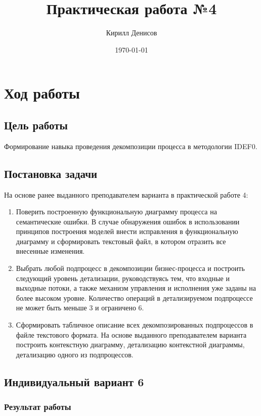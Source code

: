 \documentclass[a4paper,14pt]{extarticle}
\author{Кирилл Денисов}
\title{Практическая работа №4}
\date{\today}
\newcommand{\pathToCommonFolder}{/home/denilai/Documents/repos/latex/Common}
\begin{document}
	\thispagestyle{empty}
	
	\newpage
	\newpage
\section{Ход работы}

\subsection*{Цель работы}
Формирование навыка проведения декомпозиции
процесса в методологии IDEF0.

\subsection*{Постановка задачи}

На основе ранее выданного преподавателем
варианта в практической работе 4:
\begin{enumerate}
	\item Поверить построенную функциональную диаграмму процесса на
	семантические
	ошибки.
	В
	случае
	обнаружения
	ошибок
	в
	использовании принципов построения моделей внести исправления
	в функциональную диаграмму и сформировать текстовый файл, в
	котором отразить все внесенные изменения.
	\item Выбрать любой подпроцесс в декомпозиции бизнес-процесса и
	построить следующий уровень детализации, руководствуясь тем, что
	входные и выходные потоки, а также механизм управления и
	исполнения уже заданы на более высоком уровне. Количество
	операций в детализируемом подпроцессе не может быть меньше 3 и
	ограничено 6.
	\item Сформировать
	табличное
	описание
	всех
	декомпозированных
	подпроцессов в файле текстового формата.
	На основе выданного преподавателем варианта
	построить контекстную диаграмму, детализацию контекстной диаграммы,
	детализацию одного из подпроцессов.
\end{enumerate}

\subsection*{Индивидуальный вариант 6}

\subsubsection*{Результат работы}
\end{document}

